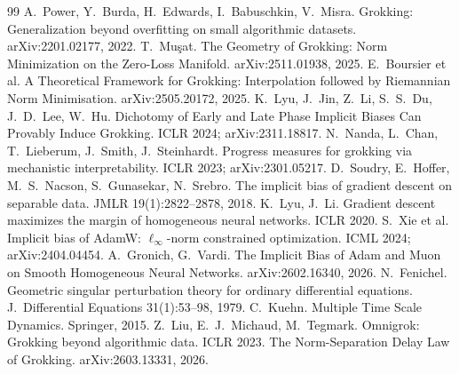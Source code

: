 \documentclass[11pt]{article}
\begin{document}
\begin{thebibliography}{99}\small
{} A.~Power, Y.~Burda, H.~Edwards, I.~Babuschkin, V.~Misra.
  Grokking: Generalization beyond overfitting on small algorithmic datasets.
  arXiv:2201.02177, 2022.
 T.~Mu\c{s}at. The Geometry of Grokking: Norm Minimization
  on the Zero-Loss Manifold. arXiv:2511.01938, 2025.
 E.~Boursier et al. A Theoretical Framework for Grokking:
  Interpolation followed by Riemannian Norm Minimisation. arXiv:2505.20172,
  2025. %
 K.~Lyu, J.~Jin, Z.~Li, S.~S.~Du, J.~D.~Lee, W.~Hu. Dichotomy
  of Early and Late Phase Implicit Biases Can Provably Induce Grokking. ICLR
  2024; arXiv:2311.18817.
 N.~Nanda, L.~Chan, T.~Lieberum, J.~Smith, J.~Steinhardt.
  Progress measures for grokking via mechanistic interpretability. ICLR 2023;
  arXiv:2301.05217.
 D.~Soudry, E.~Hoffer, M.~S.~Nacson, S.~Gunasekar,
  N.~Srebro. The implicit bias of gradient descent on separable data. JMLR
  19(1):2822--2878, 2018.
 K.~Lyu, J.~Li. Gradient descent maximizes the margin of
  homogeneous neural networks. ICLR 2020.
 S.~Xie et al. Implicit bias of AdamW: $\ell_\infty$-norm
  constrained optimization. ICML 2024; arXiv:2404.04454. %
 A.~Gronich, G.~Vardi. The Implicit Bias of Adam and Muon
  on Smooth Homogeneous Neural Networks. arXiv:2602.16340, 2026. %
 N.~Fenichel. Geometric singular perturbation theory for
  ordinary differential equations. J.\ Differential Equations 31(1):53--98,
  1979.
 C.~Kuehn. Multiple Time Scale Dynamics. Springer, 2015.
 Z.~Liu, E.~J.~Michaud, M.~Tegmark. Omnigrok: Grokking beyond
  algorithmic data. ICLR 2023. %
 The Norm-Separation Delay Law of Grokking.
  arXiv:2603.13331, 2026. %
\end{thebibliography}
\end{document}
